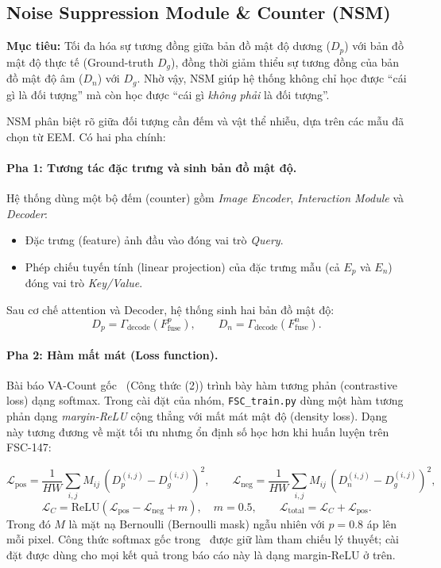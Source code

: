\documentclass[a4paper,12pt]{report}
\numberwithin{figure}{chapter}
\numberwithin{table}{chapter}
\begin{document}
\subsection{Noise Suppression Module \& Counter (NSM)}
\label{subsec:nsm}

\textbf{Mục tiêu:} Tối đa hóa sự tương đồng giữa bản đồ mật độ dương ($D_p$) với bản đồ mật độ thực tế (Ground-truth $D_g$), đồng thời giảm thiểu sự tương đồng của bản đồ mật độ âm ($D_n$) với $D_g$. Nhờ vậy, NSM giúp hệ thống không chỉ học được ``cái gì là đối tượng'' mà còn học được ``cái gì \emph{không phải} là đối tượng''.

NSM phân biệt rõ giữa đối tượng cần đếm và vật thể nhiễu, dựa trên các mẫu đã chọn từ EEM. Có hai pha chính:

\paragraph{Pha 1: Tương tác đặc trưng và sinh bản đồ mật độ.}
Hệ thống dùng một bộ đếm (counter) gồm \textit{Image Encoder}, \textit{Interaction Module} và \textit{Decoder}:
\begin{itemize}
    \item Đặc trưng (feature) ảnh đầu vào đóng vai trò \textit{Query}.
    \item Phép chiếu tuyến tính (linear projection) của đặc trưng mẫu (cả $E_p$ và $E_n$) đóng vai trò \textit{Key/Value}.
\end{itemize}
Sau cơ chế attention và Decoder, hệ thống sinh hai bản đồ mật độ:
\begin{equation}
D_p = \Gamma_{\text{decode}}(F^p_{\text{fuse}}), \qquad
D_n = \Gamma_{\text{decode}}(F^n_{\text{fuse}}).
\end{equation}

\paragraph{Pha 2: Hàm mất mát (Loss function).}
Bài báo VA-Count gốc~\cite{vacount} (Công thức (2)) trình bày hàm tương phản (contrastive loss) dạng softmax. Trong cài đặt của nhóm, \texttt{FSC\_train.py} dùng một hàm tương phản dạng \emph{margin-ReLU} cộng thẳng với mất mát mật độ (density loss). Dạng này tương đương về mặt tối ưu nhưng ổn định số học hơn khi huấn luyện trên FSC-147:

\begin{equation}
\mathcal{L}_{\text{pos}} = \frac{1}{HW}\sum_{i,j} M_{ij}\,(D^{(i,j)}_p - D^{(i,j)}_g)^2,
\qquad
\mathcal{L}_{\text{neg}} = \frac{1}{HW}\sum_{i,j} M_{ij}\,(D^{(i,j)}_n - D^{(i,j)}_g)^2,
\end{equation}
\begin{equation}
\mathcal{L}_{C} = \mathrm{ReLU}\!\left(\mathcal{L}_{\text{pos}} - \mathcal{L}_{\text{neg}} + m\right),\quad m = 0.5,
\qquad
\mathcal{L}_{\text{total}} = \mathcal{L}_{C} + \mathcal{L}_{\text{pos}}.
\end{equation}
Trong đó $M$ là mặt nạ Bernoulli (Bernoulli mask) ngẫu nhiên với $p=0{.}8$ áp lên mỗi pixel. Công thức softmax gốc trong~\cite{vacount} được giữ làm tham chiếu lý thuyết; cài đặt được dùng cho mọi kết quả trong báo cáo này là dạng margin-ReLU ở trên.
\end{document}
